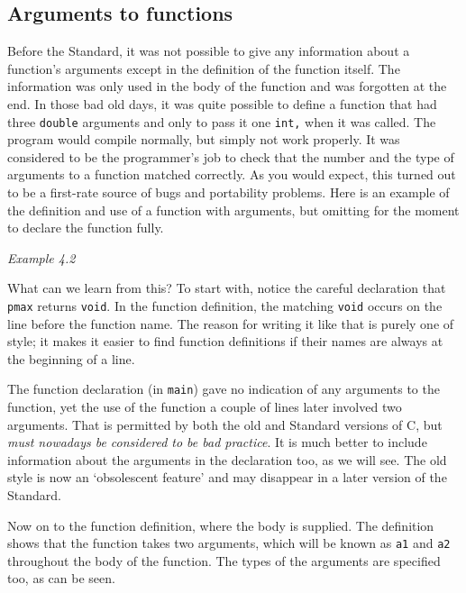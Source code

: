   

  \subsection{Arguments to functions}
   

   Before the Standard, it was not possible to give any information about
    a function's arguments except in the definition of the function itself.
    The information was only used in the body of the function and was
    forgotten at the end. In those bad old days, it was quite possible to
    define a function that had three \texttt{double} arguments and only
    to pass it one \texttt{int,} when it was called. The program would
    compile normally, but simply not work properly. It was considered to be
    the programmer's job to check that the number and the type of arguments
    to a function matched correctly. As you would expect, this turned out to
    be a first-rate source of bugs and portability problems. Here is an
    example of the definition and use of a function with arguments, but
    omitting for the moment to declare the function fully.


\begin{center}\textit{Example 4.2}\end{center}

   What can we learn from this? To start with, notice the careful
    declaration that \texttt{pmax} returns \texttt{void}. In the
    function definition, the matching \texttt{void} occurs on the line
    before the function name. The reason for writing it like that is purely
    one of style; it makes it easier to find function definitions if their
    names are always at the beginning of a line.


   The function declaration (in \texttt{main}) gave no indication of
    any arguments to the function, yet the use of the function a couple of
    lines later involved two arguments. That is permitted by both the old
    and Standard versions of C, but \textit{must nowadays be considered to be
     bad practice}. It is much better to include information about the
    arguments in the declaration too, as we will see. The old style is now
    an `obsolescent feature' and may disappear in a later version of
    the Standard.


   Now on to the function definition, where the body is supplied. The
    definition shows that the function takes two arguments, which will be
    known as \texttt{a1} and \texttt{a2} throughout the body of the
    function. The types of the arguments are specified too, as can be
    seen.


